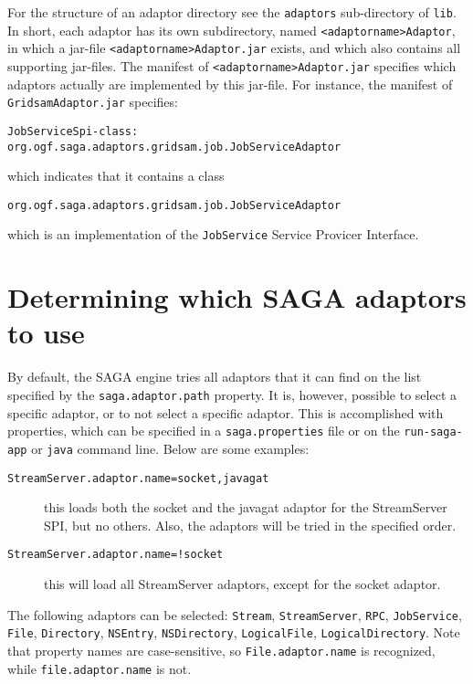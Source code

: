 \documentclass[a4paper,10pt]{article}
\begin{document}
For the structure of an adaptor directory see the \texttt{adaptors}
sub-directory of \texttt{lib}.
In short, each adaptor has its own subdirectory, named
\texttt{<adaptorname>Adaptor},
in which a jar-file
\texttt{<adaptorname>Adaptor.jar}
exists, and which also contains
all supporting jar-files.
The manifest of
\texttt{<adaptorname>Adaptor.jar} specifies which adaptors actually
are implemented by this jar-file. For instance, 
the manifest of \texttt{GridsamAdaptor.jar} specifies:

\noindent
{\small
\begin{verbatim}
JobServiceSpi-class: org.ogf.saga.adaptors.gridsam.job.JobServiceAdaptor
\end{verbatim}
}
\noindent

which indicates that it contains a class
\noindent
{\small
\begin{verbatim}
org.ogf.saga.adaptors.gridsam.job.JobServiceAdaptor
\end{verbatim}
}
\noindent
which is an implementation of the \texttt{JobService}
Service Provicer Interface.

\section{Determining which SAGA adaptors to use}

By default, the SAGA engine tries all adaptors that it can find on the list
specified by the \texttt{saga.adaptor.path} property.
It is, however, possible to select a specific
adaptor, or to not select a specific adaptor. This is accomplished
with properties, which can be specified in a \texttt{saga.properties} file or
on the \texttt{run-saga-app} or \texttt{java} command line.
Below are some examples:

\begin{description}

\item[\texttt{StreamServer.adaptor.name=socket,javagat}]
this loads both the socket and the javagat adaptor for
the StreamServer SPI, but no others. Also, the adaptors will
be tried in the specified order.

\item[\texttt{StreamServer.adaptor.name=!socket}]
this will load all StreamServer adaptors, except for the socket
adaptor.

\end{description}

The following adaptors can be selected:
\texttt{Stream},
\texttt{StreamServer},
\texttt{RPC},
\texttt{JobService},
\texttt{File},
\texttt{Directory},
\texttt{NSEntry},
\texttt{NSDirectory},
\texttt{LogicalFile},
\texttt{LogicalDirectory}.
Note that property names are case-sensitive, so
\texttt{File.adaptor.name} is recognized, while \texttt{file.adaptor.name} is
not.
\end{document}
